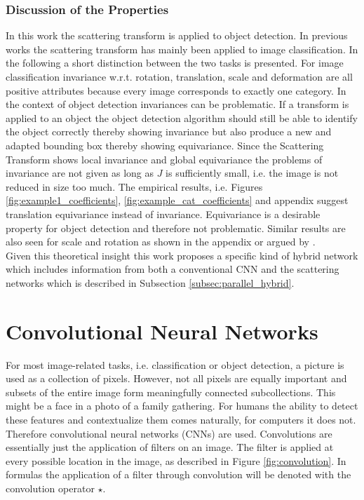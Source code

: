 \subsubsection{Discussion of the Properties}

In this work the scattering transform is applied to object detection. In previous works the scattering transform has mainly been applied to image classification. In the following a short distinction between the two tasks is presented. For image classification invariance w.r.t. rotation, translation, scale and deformation are all positive attributes because every image corresponds to exactly one category. In the context of object detection invariances can be problematic. If a transform is applied to an object the object detection algorithm should still be able to identify the object correctly thereby showing invariance but also produce a new and adapted bounding box thereby showing equivariance. Since the Scattering Transform shows local invariance and global equivariance the problems of invariance are not given as long as $J$ is sufficiently small, i.e. the image is not reduced in size too much. The empirical results, i.e. Figures \ref{fig:example1_coefficients}, \ref{fig:example_cat_coefficients} and appendix suggest translation equivariance instead of invariance. Equivariance is a desirable property for object detection and therefore not problematic. Similar results are also seen for scale and rotation as shown in the appendix or argued by \cite{RotationScalingDeformationSifre2013}. \\
Given this theoretical insight this work proposes a specific kind of hybrid network which includes information from both a conventional CNN and the scattering networks which is described in Subsection \ref{subsec:parallel_hybrid}. 

     
 \section{Convolutional Neural Networks}
 \label{sec:cnns}
 
 For most image-related tasks, i.e. classification or object detection, a picture is used as a collection of pixels. However, not all pixels are equally important and subsets of the entire image form meaningfully connected subcollections. This might be a face in a photo of a family gathering. For humans the ability to detect these features and contextualize them comes naturally, for computers it does not. Therefore convolutional neural networks (CNNs) \cite{LeCun1989BackpropagationAT} are used. Convolutions are essentially just the application of filters on an image. The filter is applied at every possible location in the image, as described in Figure \ref{fig:convolution}. In formulas the application of a filter through convolution will be denoted with the convolution operator $\star$.
 
